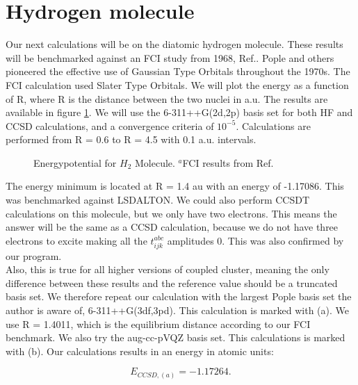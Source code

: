 \section{Hydrogen molecule}
Our next calculations will be on the diatomic hydrogen molecule. These results will be benchmarked against an FCI study from 1968, Ref.\cite{fci_h2_molecule_stuff}. Pople and others pioneered the effective use of Gaussian Type Orbitals throughout the 1970s. The FCI calculation used Slater Type Orbitals. We will plot the energy as a function of R, where R is the distance between the two nuclei in a.u. The results are available in figure \ref{fig:h2poten}. We will use the 6-311++G(2d,2p) basis set for both HF and CCSD calculations, and a convergence criteria of $10^{-5}$. Calculations are performed from R = 0.6 to R = 4.5 with 0.1 a.u. intervals. \\

\begin{figure}[h!]
\begin{center}
\caption{Energypotential for $H_2$ Molecule. 
$^a$FCI results from Ref.\cite{fci_h2_molecule_stuff}}
\label{fig:h2poten}
\end{center}
\end{figure}

The energy minimum is located at R = 1.4 au with an energy of -1.17086. This was benchmarked against LSDALTON. We could also perform CCSDT calculations on this molecule, but we only have two electrons. This means the answer will be the same as a CCSD calculation, because we do not have three electrons to excite making all the $t_{ijk}^{abc}$ amplitudes 0. This was also confirmed by our program. \\

Also, this is true for all higher versions of coupled cluster, meaning the only difference between these results and the  reference value should be a truncated basis set. We therefore repeat our calculation with the largest Pople basis set the author is aware of, 6-311++G(3df,3pd). This calculation is marked with (a). We use R = 1.4011, which is the equilibrium distance according to our FCI benchmark. We also try the aug-cc-pVQZ basis set. This calculations is marked with (b). Our calculations results in an energy in atomic units:

\begin{equation}
E_{CCSD,(a)} = -1.17264 .
\end{equation}

